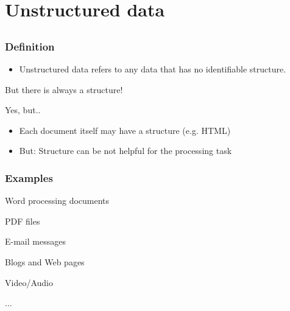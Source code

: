 \documentclass{beamer}
\begin{document}
\section{Unstructured data}
\subsection*{}

\begin{frame}
	\frametitle{Definition}
		\begin{itemize}
			\item Unstructured data refers to any data that has no identifiable structure.
		\end{itemize}
\end{frame}


\begin{frame}
	\begin{center}
	\large But there is always a structure!
	\end{center}
\end{frame}

\begin{frame}{Yes, but..}
	\begin{itemize}
		\item Each document itself may have a structure (e.g. HTML)
		\item But: Structure can be not helpful for the processing task
	\end{itemize}

\end{frame}

\begin{frame}
	\frametitle{Examples}
	\begin{description}
		\item Word processing documents
		\item PDF files
		\item E-mail messages 
		\item Blogs and Web pages
		\item Video/Audio
		\item ...
	\end{description}
\end{frame}
\end{document}
